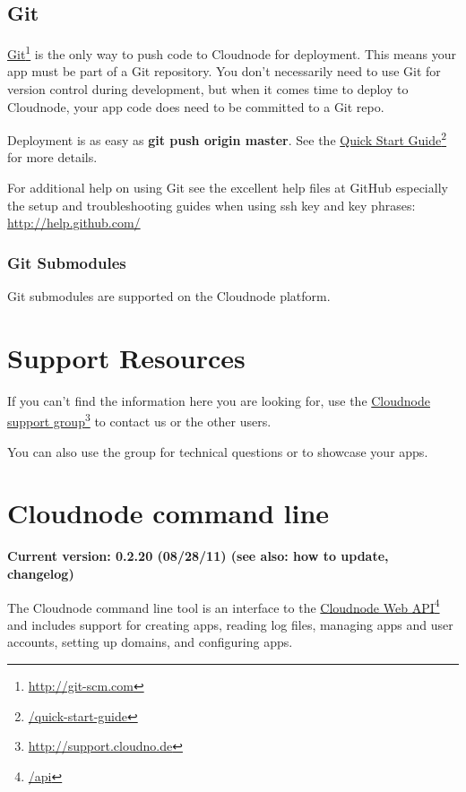 \section{Git}
\label{git}

\href{http://git-scm.com}{Git}\footnote{\href{http://git-scm.com}{http:/\slash git-scm.com}} is the only way to push code to Cloudnode for deployment. This means your app must be part of a Git repository. You don’t necessarily need to use Git for version control during development, but when it comes time to deploy to Cloudnode, your app code does need to be committed to a Git repo.

Deployment is as easy as \textbf{git push origin master}. See the \href{/quick-start-guide}{Quick Start Guide}\footnote{\href{/quick-start-guide}{\slash quick-start-guide}} for more details.

For additional help on using Git see the excellent help files at GitHub especially the setup and troubleshooting guides when using ssh key and key phrases: \href{http://help.github.com/}{http:/\slash help.github.com\slash }

\subsection{Git Submodules}
\label{gitsubmodules}

Git submodules are supported on the Cloudnode platform.

\chapter{Support Resources}
\label{supportresources}

If you can't find the information here you are looking for, use the \href{http://support.cloudno.de}{Cloudnode support group}\footnote{\href{http://support.cloudno.de}{http:/\slash support.cloudno.de}} to contact us or the other users. 

You can also use the group for technical questions or to showcase your apps.

\chapter{Cloudnode command line}
\label{cloudnodecommandline}

\textbf{Current version: 0.2.20 (08\slash 28\slash 11) (see also: how to update, changelog)}

The Cloudnode command line tool is an interface to the \href{/api}{Cloudnode Web API}\footnote{\href{/api}{\slash api}} and includes support for creating apps, reading log files, managing apps and user accounts, setting up domains, and configuring apps. 

